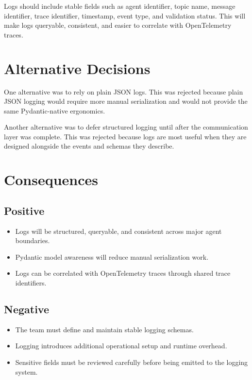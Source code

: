 \documentclass[11pt]{article}
\begin{document}
Logs should include stable fields such as agent identifier, topic name, message identifier, trace identifier, timestamp, event type, and validation status. This will make logs queryable, consistent, and easier to correlate with OpenTelemetry traces.

\section{Alternative Decisions}

One alternative was to rely on plain JSON logs. This was rejected because plain JSON logging would require more manual serialization and would not provide the same Pydantic-native ergonomics.

Another alternative was to defer structured logging until after the communication layer was complete. This was rejected because logs are most useful when they are designed alongside the events and schemas they describe.

\section{Consequences}

\subsection{Positive}

\begin{itemize}
    \item Logs will be structured, queryable, and consistent across major agent boundaries.
    \item Pydantic model awareness will reduce manual serialization work.
    \item Logs can be correlated with OpenTelemetry traces through shared trace identifiers.
\end{itemize}

\subsection{Negative}

\begin{itemize}
    \item The team must define and maintain stable logging schemas.
    \item Logging introduces additional operational setup and runtime overhead.
    \item Sensitive fields must be reviewed carefully before being emitted to the logging system.
\end{itemize}
\end{document}

